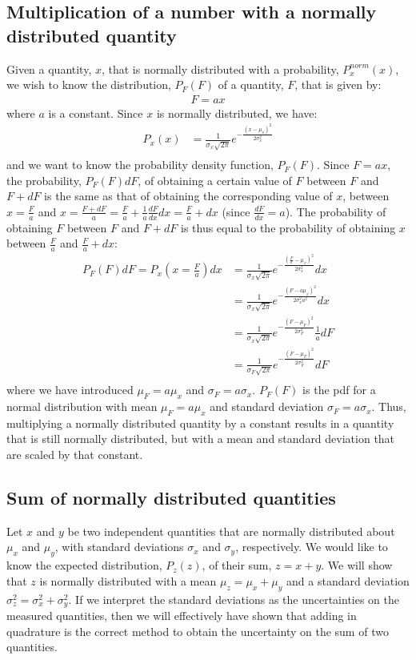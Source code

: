 \subsection{Multiplication of a number with a normally distributed quantity}
Given a quantity, $x$, that is normally distributed with a probability, $P^{norm}_x(x)$, we wish to know the distribution, $P_F(F)$ of a quantity, $F$, that is given by:
\begin{align*}
F=ax
\end{align*}
where $a$ is a constant. Since $x$ is normally distributed, we have:
\begin{align*}
P_x(x)&=\frac{1}{\sigma_x\sqrt{2\pi}}e^{-\frac{(x-\mu_x)^2}{2\sigma_x^2}}\\
\end{align*}
and we want to know the probability density function, $P_F(F)$. Since $F=ax$, the probability, $P_F(F)dF$, of obtaining a certain value of $F$ between $F$ and $F+dF$ is the same as that of obtaining the corresponding value of $x$, between $x=\frac{F}{a}$ and $x=\frac{F+dF}{a}=\frac{F}{a}+\frac{1}{a}\frac{dF}{dx}dx = \frac{F}{a}+dx$ (since  $\frac{dF}{dx}=a$). The probability of obtaining $F$ between $F$ and $F+dF$ is thus equal to the probability of obtaining $x$ between $\frac{F}{a}$ and $\frac{F}{a}+dx$: 
\begin{align}
\label{eqn:normmultconstant}
P_F(F)dF=P_x(x=\frac{F}{a})dx&=\frac{1}{\sigma_x\sqrt{2\pi}}e^{-\frac{(\frac{F}{a}-\mu_x)^2}{2\sigma_x^2}}dx \nonumber\\
&=\frac{1}{\sigma_x\sqrt{2\pi}}e^{-\frac{(F-a\mu_x)^2}{2\sigma_x^2a^2}}dx\nonumber\\
&=\frac{1}{\sigma_x\sqrt{2\pi}}e^{-\frac{(F-\mu_F)^2}{2\sigma_F^2}}\frac{1}{a}dF\\
&=\frac{1}{\sigma_F\sqrt{2\pi}}e^{-\frac{(F-\mu_F)^2}{2\sigma_F^2}}dF\\
\end{align}
where we have introduced $\mu_F=a\mu_x$ and $\sigma_F=a\sigma_x$. $P_F(F)$ is the pdf for a normal distribution with mean $\mu_F=a\mu_x$ and standard deviation $\sigma_F=a\sigma_x$. Thus, multiplying a normally distributed quantity by a constant results in a quantity that is still normally distributed, but with a mean and standard deviation that are scaled by that constant. 

\subsection{Sum of normally distributed quantities}
Let $x$ and $y$ be two independent quantities that are normally distributed about $\mu_x$ and $\mu_y$, with standard deviations $\sigma_x$ and $\sigma_y$, respectively. We would like to know the expected distribution, $P_z(z)$, of their sum, $z=x+y$. We will show that $z$ is normally distributed with a mean $\mu_z=\mu_x+\mu_y$ and a standard deviation $\sigma_z^2=\sigma_x^2+\sigma_y^2$. If we interpret the standard deviations as the uncertainties on the measured quantities, then we will effectively have shown that adding in quadrature is the correct method to obtain the uncertainty on the sum of two quantities.

